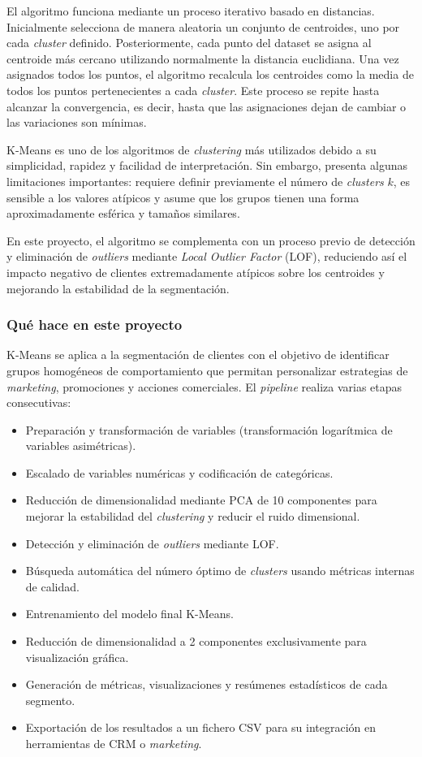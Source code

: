 \documentclass[11pt,a4paper]{article}
\begin{document}
El algoritmo funciona mediante un proceso iterativo basado en distancias. Inicialmente selecciona de manera aleatoria un conjunto de centroides, uno por cada \textit{cluster} definido. Posteriormente, cada punto del dataset se asigna al centroide más cercano utilizando normalmente la distancia euclidiana. Una vez asignados todos los puntos, el algoritmo recalcula los centroides como la media de todos los puntos pertenecientes a cada \textit{cluster}. Este proceso se repite hasta alcanzar la convergencia, es decir, hasta que las asignaciones dejan de cambiar o las variaciones son mínimas.

K-Means es uno de los algoritmos de \textit{clustering} más utilizados debido a su simplicidad, rapidez y facilidad de interpretación. Sin embargo, presenta algunas limitaciones importantes: requiere definir previamente el número de \textit{clusters} $k$, es sensible a los valores atípicos y asume que los grupos tienen una forma aproximadamente esférica y tamaños similares.

En este proyecto, el algoritmo se complementa con un proceso previo de detección y eliminación de \textit{outliers} mediante \textit{Local Outlier Factor} (LOF), reduciendo así el impacto negativo de clientes extremadamente atípicos sobre los centroides y mejorando la estabilidad de la segmentación.

\subsubsection{Qué hace en este proyecto}

K-Means se aplica a la segmentación de clientes con el objetivo de identificar grupos homogéneos de comportamiento que permitan personalizar estrategias de \textit{marketing}, promociones y acciones comerciales. El \textit{pipeline} realiza varias etapas consecutivas:

\begin{itemize}
    \item Preparación y transformación de variables (transformación logarítmica de variables asimétricas).
    \item Escalado de variables numéricas y codificación de categóricas.
    \item Reducción de dimensionalidad mediante PCA de 10 componentes para mejorar la estabilidad del \textit{clustering} y reducir el ruido dimensional.
    \item Detección y eliminación de \textit{outliers} mediante LOF.
    \item Búsqueda automática del número óptimo de \textit{clusters} usando métricas internas de calidad.
    \item Entrenamiento del modelo final K-Means.
    \item Reducción de dimensionalidad a 2 componentes exclusivamente para visualización gráfica.
    \item Generación de métricas, visualizaciones y resúmenes estadísticos de cada segmento.
    \item Exportación de los resultados a un fichero CSV para su integración en herramientas de CRM o \textit{marketing}.
\end{itemize}
\end{document}
